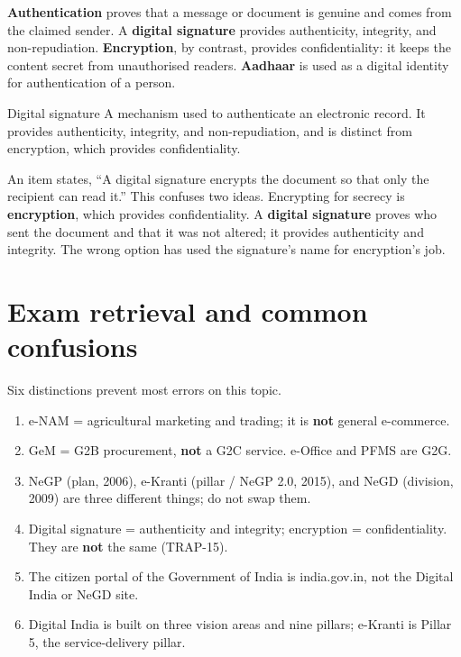 \textbf{Authentication} proves that a message or document is genuine and
comes from the claimed sender. A \textbf{digital signature} provides
authenticity, integrity, and non-repudiation. \textbf{Encryption}, by
contrast, provides confidentiality: it keeps the content secret from
unauthorised readers. \textbf{Aadhaar} is used as a digital identity for
authentication of a person.

\begin{definitionbox}{Digital signature}
A mechanism used to authenticate an electronic record. It provides
authenticity, integrity, and non-repudiation, and is distinct from
encryption, which provides confidentiality.
\end{definitionbox}

\begin{example}
An item states, ``A digital signature encrypts the document so that only the
recipient can read it.'' This confuses two ideas. Encrypting for secrecy is
\textbf{encryption}, which provides confidentiality. A \textbf{digital
signature} proves who sent the document and that it was not altered; it
provides authenticity and integrity. The wrong option has used the
signature's name for encryption's job.
\end{example}

\section{Exam retrieval and common confusions}
Six distinctions prevent most errors on this topic.
\begin{enumerate}
  \item e-NAM = agricultural marketing and trading; it is \textbf{not}
    general e-commerce.
  \item GeM = G2B procurement, \textbf{not} a G2C service. e-Office and PFMS
    are G2G.
  \item NeGP (plan, 2006), e-Kranti (pillar / NeGP 2.0, 2015), and NeGD
    (division, 2009) are three different things; do not swap them.
  \item Digital signature = authenticity and integrity; encryption =
    confidentiality. They are \textbf{not} the same (TRAP-15).
  \item The citizen portal of the Government of India is india.gov.in, not
    the Digital India or NeGD site.
  \item Digital India is built on three vision areas and nine pillars;
    e-Kranti is Pillar 5, the service-delivery pillar.
\end{enumerate}

